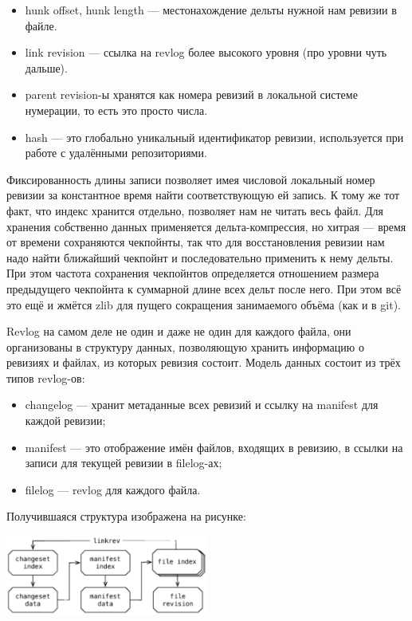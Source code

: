 \documentclass[a5paper]{article}
\begin{document}
\begin{itemize}
    \item hunk offset, hunk length --- местонахождение дельты нужной нам ревизии в файле. 
    \item link revision --- ссылка на revlog более высокого уровня (про уровни чуть дальше).
    \item parent revision-ы хранятся как номера ревизий в локальной системе нумерации, то есть это просто числа.
    \item hash --- это глобально уникальный идентификатор ревизии, используется при работе с удалёнными репозиториями.
\end{itemize}

Фиксированность длины записи позволяет имея числовой локальный номер ревизии за константное время найти соответствующую ей запись. К тому же тот факт, что индекс хранится отдельно, позволяет нам не читать весь файл. Для хранения собственно данных применяется дельта-компрессия, но хитрая --- время от времени сохраняются чекпойнты, так что для восстановления ревизии нам надо найти ближайший чекпойнт и последовательно применить к нему дельты. При этом частота сохранения чекпойнтов определяется отношением размера предыдущего чекпойнта к суммарной длине всех дельт после него. При этом всё это ещё и жмётся zlib для пущего сокращения занимаемого объёма (как и в git).

Revlog на самом деле не один и даже не один для каждого файла, они организованы в структуру данных, позволяющую хранить информацию о ревизиях и файлах, из которых ревизия состоит. Модель данных состоит из трёх типов revlog-ов:

\begin{itemize}
    \item changelog --- хранит метаданные всех ревизий и ссылку на manifest для каждой ревизии;
    \item manifest --- это отображение имён файлов, входящих в ревизию, в ссылки на записи для текущей ревизии в filelog-ах;
    \item filelog --- revlog для каждого файла.
\end{itemize}

Получившаяся структура изображена на рисунке:

\begin{center}
    \includegraphics[width=0.5\textwidth]{mercurialLogStructure.png}
\end{center}
\end{document}

